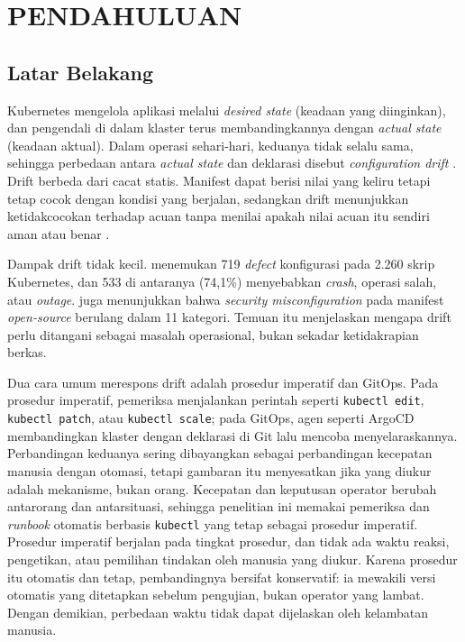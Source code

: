 \chapter{PENDAHULUAN}

\section{Latar Belakang}

Kubernetes mengelola aplikasi melalui \textit{desired state} (keadaan yang diinginkan), dan pengendali di dalam klaster terus membandingkannya dengan \textit{actual state} (keadaan aktual). Dalam operasi sehari-hari, keduanya tidak selalu sama, sehingga perbedaan antara \textit{actual state} dan deklarasi disebut \textit{configuration drift} \citep{pohjola2025mitigating}. Drift berbeda dari cacat statis. Manifest dapat berisi nilai yang keliru tetapi tetap cocok dengan kondisi yang berjalan, sedangkan drift menunjukkan ketidakcocokan terhadap acuan tanpa menilai apakah nilai acuan itu sendiri aman atau benar \citep{zhang2026configuration, rahman2023security}.

Dampak drift tidak kecil. \citet{zhang2026configuration} menemukan 719 \textit{defect} konfigurasi pada 2.260 skrip Kubernetes, dan 533 di antaranya (74,1\%) menyebabkan \textit{crash}, operasi salah, atau \textit{outage}. \citet{rahman2023security} juga menunjukkan bahwa \textit{security misconfiguration} pada manifest \textit{open-source} berulang dalam 11 kategori. Temuan itu menjelaskan mengapa drift perlu ditangani sebagai masalah operasional, bukan sekadar ketidakrapian berkas.

Dua cara umum merespons drift adalah prosedur imperatif dan GitOps. Pada prosedur imperatif, pemeriksa menjalankan perintah seperti \texttt{kubectl\allowbreak{} edit}, \texttt{kubectl\allowbreak{} patch}, atau \texttt{kubectl\allowbreak{} scale}; pada GitOps, agen seperti ArgoCD membandingkan klaster dengan deklarasi di Git lalu mencoba menyelaraskannya. Perbandingan keduanya sering dibayangkan sebagai perbandingan kecepatan manusia dengan otomasi, tetapi gambaran itu menyesatkan jika yang diukur adalah mekanisme, bukan orang. Kecepatan dan keputusan operator berubah antarorang dan antarsituasi, sehingga penelitian ini memakai pemeriksa dan \textit{runbook} otomatis berbasis \texttt{kubectl} yang tetap sebagai prosedur imperatif. Prosedur imperatif berjalan pada tingkat prosedur, dan tidak ada waktu reaksi, pengetikan, atau pemilihan tindakan oleh manusia yang diukur. Karena prosedur itu otomatis dan tetap, pembandingnya bersifat konservatif: ia mewakili versi otomatis yang ditetapkan sebelum pengujian, bukan operator yang lambat. Dengan demikian, perbedaan waktu tidak dapat dijelaskan oleh kelambatan manusia.

